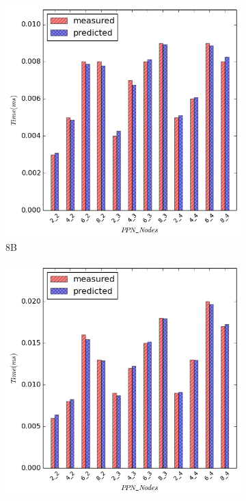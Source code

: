 \begin{figure}[H]
    \centering
    \captionsetup{justification=centering,margin=0cm,font=footnotesize}
    \begin{subfigure}[b]{0.4\textwidth}
        \includegraphics[width=\textwidth]{./images/allreduce_NUMA/allreduce_8.png}
        \caption{8B}
    \end{subfigure}
    \quad 
        \begin{subfigure}[b]{0.4\textwidth}
        \includegraphics[width=\textwidth]{./images/allreduce_NUMA/allreduce_1024.png}

\end{subfigure}
\end{figure}
